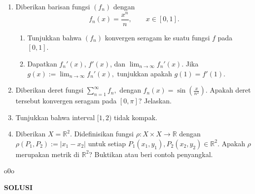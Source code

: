 \documentclass[11pt,letterpaper]{article}
\newcommand{\R}{\mathbb{R}}
\begin{document}
\begin{enumerate}
  \item Diberikan barisan fungsi $(f_n)$ dengan
        \[
          f_n(x) = \frac{x^n}{n}, \qquad x \in [0,1].
        \]
        \begin{enumerate}
          \item Tunjukkan bahwa $(f_n)$ konvergen seragam ke suatu fungsi $f$ pada $[0,1]$.
          \item Dapatkan $f_n'(x)$, $f'(x)$, dan
                $
                  \lim_{n\to\infty} f_n'(x).
                $
                Jika
                $
                  g(x) := \lim_{n\to\infty} f_n'(x),
                $
                tunjukkan apakah $g(1)=f'(1)$.
        \end{enumerate}

  \item Diberikan deret fungsi
        $
          \sum_{n=1}^{\infty} f_n,
        $ dengan
        $
          f_n(x) = \sin\left(\frac{x}{n^2}\right).
        $
        Apakah deret tersebut konvergen seragam pada $[0,\pi]$? Jelaskan.

  \item Tunjukkan bahwa interval $[1,2)$ tidak kompak.

  \item Diberikan $X=\R^2$. Didefinisikan fungsi $\rho : X\times X \to \R$ dengan
        $
          \rho(P_1,P_2) := |x_1-x_2|
        $
        untuk setiap $P_1(x_1,y_1),P_2(x_2,y_2)\in\R^2$. Apakah $\rho$ merupakan metrik di $\R^2$? Buktikan atau beri contoh penyangkal.
\end{enumerate}

\vspace{0.5cm}
\begin{center}
  \raisebox{.5ex}{\rule{0.5cm}{.4pt}}o0o\raisebox{.5ex}{\rule{0.5cm}{.4pt}}
\end{center}

\newpage
\begin{center}
  \textbf{SOLUSI}
\end{center}
\end{document}
